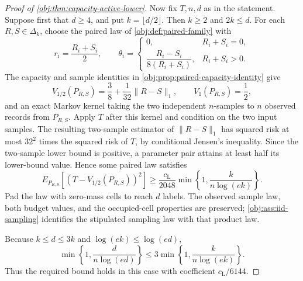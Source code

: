 \documentclass[11pt]{article}
\begin{document}
\begin{proof}[Proof of \cref{obj:thm:capacity-active-lower}]
Now fix \(T,n,d\) as in the statement. Suppose first that \(d\ge4\), and put \(k=\lfloor d/2\rfloor\). Then \(k\ge2\) and \(2k\le d\). For each \(R,S\in\Delta_k\), choose the paired law of \cref{obj:def:paired-family} with
\[
r_i=\frac{R_i+S_i}{2},\qquad
\theta_i=
\begin{cases}
0,&R_i+S_i=0,\\[2pt]
\dfrac{R_i-S_i}{8(R_i+S_i)},&R_i+S_i>0.
\end{cases}
\] %
The capacity and sample identities in \cref{obj:prop:paired-capacity-identity} give
\[
V_{1/2}(P_{R,S})=\frac38+\frac1{32}\|R-S\|_1,
\qquad V_1(P_{R,S})=\frac12,
\] %
and an exact Markov kernel taking the two independent \(n\)-samples to \(n\) observed records from \(P_{R,S}\). Apply \(T\) after this kernel and condition on the two input samples. The resulting two-sample estimator of \(\|R-S\|_1\) has squared risk at most \(32^2\) times the squared risk of \(T\), by conditional Jensen’s inequality. Since the two-sample lower bound is positive, a parameter pair attains at least half its lower-bound value. Hence some paired law satisfies
\[
E_{P_{R,S}}\!\left[(T-V_{1/2}(P_{R,S}))^2\right]
\ge \frac{c_{\mathrm L}}{2048}
 \min\left\{1,\frac{k}{n\log(ek)}\right\}.
\] %
Pad the law with zero-mass cells to reach \(d\) labels. The observed sample law, both budget values, and the occupied-cell properties are preserved; \cref{obj:ass:iid-sampling} identifies the stipulated sampling law with that product law. %

Because \(k\le d\le3k\) and \(\log(ek)\le\log(ed)\),
\[
\min\left\{1,\frac{d}{n\log(ed)}\right\}
\le3\min\left\{1,\frac{k}{n\log(ek)}\right\}.
\] %
Thus the required bound holds in this case with coefficient \(c_{\mathrm L}/6144\). %


\end{proof}
\end{document}
